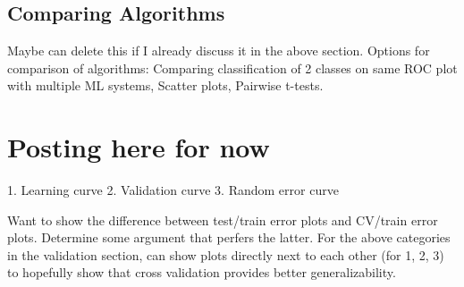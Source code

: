 \subsection{Comparing Algorithms}

Maybe can delete this if I already discuss it in the above section. Options for
comparison of algorithms: Comparing classification of 2 classes on same ROC
plot with multiple ML systems, Scatter plots, Pairwise t-tests. 

\section{Posting here for now}

1. Learning curve
2. Validation curve
3. Random error curve

Want to show the difference between test/train error plots and CV/train error
plots.  Determine some argument that perfers the latter. For the above
categories in the validation section, can show plots directly next to each
other (for 1, 2, 3) to hopefully show that cross validation provides better
generalizability.


%

